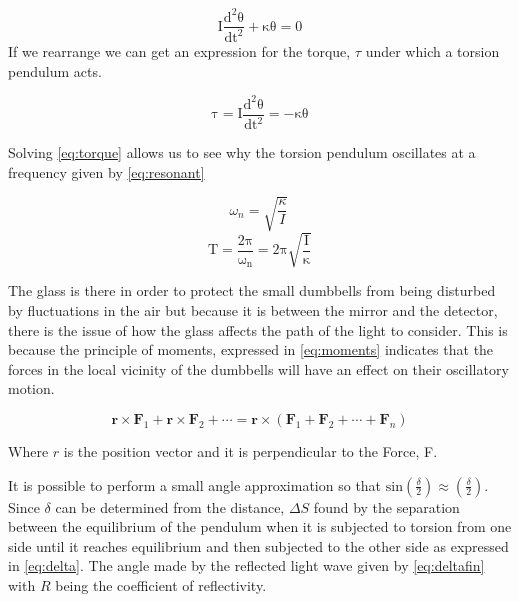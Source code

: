 \documentclass[12pt]{article}
\begin{document}
\begin{equation}
\label{eq:eom}
\mathrm{I\frac{d^2\theta}{dt^2}+ \kappa\theta = 0}
\end{equation}
\noindent 
If we rearrange we can get an expression for the torque, $\tau$ under which a torsion pendulum acts.

\begin{equation} 
\label{eq:torque}
\mathrm{\tau =I\frac{d^2\theta}{dt^2}= -\kappa \theta}
\end{equation}

\noindent 
Solving \cref{eq:torque} allows us to see why the torsion pendulum oscillates at a frequency given by \cref{eq:resonant}

\begin{equation}
\label{eq:resonant}
\omega_n =\sqrt{\frac{\kappa}{I}}\,
\end{equation}
\begin{equation}
\label{eq:period}
\mathrm{T= \frac{2\pi}{\omega_n} = 2\pi \sqrt{\frac{I}{\kappa}}}
\end{equation}

\noindent
The glass is there in order to protect the small dumbbells from being disturbed by fluctuations in the air but because it is between the mirror and the detector, there is the issue of how the glass affects the path of the light to consider. This is because the principle of moments, expressed in \cref{eq:moments} indicates that the forces in the local vicinity of the dumbbells will have an effect on their oscillatory motion.  

\begin{equation}
\label{eq:moments}
\mathbf{r}\times\mathbf{F}_1 + \mathbf{r}\times\mathbf{F}_2 + \cdots = \mathbf{r}\times(\mathbf{F}_1+\mathbf{F}_2 + \cdots  +\mathbf{F}_n )
\end{equation}

\noindent 
Where $r$ is the position vector and it is perpendicular to the Force, F. 


\noindent 
It is possible to perform a small angle approximation so that $\mathrm{sin}\left(\frac{\delta}{2}\right)\approx\left(\frac{\delta}{2}\right)$. Since $\delta$ can be determined from the distance, $\Delta S$ found by the separation between the equilibrium of the pendulum when it is subjected to torsion from one side until it reaches equilibrium and then subjected to the other side as expressed in \cref{eq:delta}. The angle made by the reflected light wave given by \cref{eq:deltafin} with $R$ being the coefficient of reflectivity. 
\end{document}
